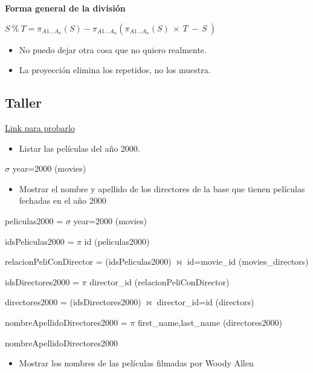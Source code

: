 \medskip
\textbf{Forma general de la división}

\begin{center}
    $S \ \% \ T =  \pi_{A1 \ldots A_{n}}(S) - \pi_{A1 \ldots A_{n}}(\pi_{A1 \ldots A_{n}}(S)\ \times\ T\ -\ S \ )$
\end{center}



\begin{itemize}
\item No puedo dejar otra cosa que no quiero realmente.
\item La proyección elimina los repetidos, no los muestra.
\end{itemize}

\newpage
\subsection*{Taller}
\href{https://dbis-uibk.github.io/relax/calc/gist/552932a29392f8272951e01ada813ae1}{Link para probarlo}


\begin{itemize}
\item Listar las películas del año 2000.
\end{itemize}

$\sigma$ year=2000 (movies)


\begin{itemize}
\item Mostrar el nombre y apellido de los directores de la base que tienen películas fechadas en el año 2000
\end{itemize}


peliculas2000 = $\sigma$ year=2000 (movies)

idsPeliculas2000 = $\pi$ id (peliculas2000)

relacionPeliConDirector = (idsPeliculas2000) $\bowtie$ id=movie\_id (movies\_directors)

idsDirectores2000 = $\pi$ director\_id (relacionPeliConDirector)

directores2000 = (idsDirectores2000) $\bowtie$ director\_id=id (directors)

nombreApellidoDirectores2000 = $\pi$ first\_name,last\_name (directores2000)

nombreApellidoDirectores2000



\begin{itemize}
\item Mostrar los nombres de las películas filmadas por Woody Allen
\end{itemize}

